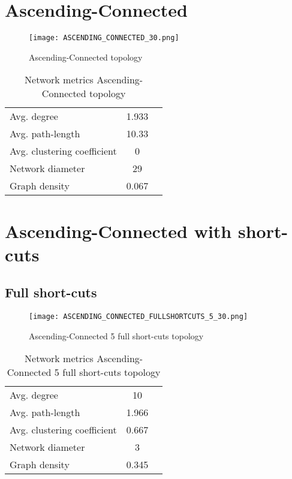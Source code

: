 \documentclass[Bachelorarbeit.tex]{subfiles}
\begin{document}
\section{Ascending-Connected}
\begin{figure}[H]
	\centering
  \texttt{[image: ASCENDING\_CONNECTED\_30.png]}
	\caption{Ascending-Connected topology}
	\label{fig1}
\end{figure}

\begin{table}[h]
	\centering
	\caption{Network metrics Ascending-Connected topology}
	\begin{tabular} { l c r }
		\hline
		Avg. degree & 1.933 \\
		Avg. path-length & 10.33 \\
		Avg. clustering coefficient & 0 \\
		Network diameter & 29 \\
		Graph density & 0.067 \\
		\hline
	\end{tabular}
\end{table}

\section{Ascending-Connected with short-cuts}
\subsection{Full short-cuts}
\begin{figure}[H]
	\centering
  \texttt{[image: ASCENDING\_CONNECTED\_FULLSHORTCUTS\_5\_30.png]}
	\caption{Ascending-Connected 5 full short-cuts topology}
	\label{fig1}
\end{figure}

\begin{table}[h]
	\centering
	\caption{Network metrics Ascending-Connected 5 full short-cuts topology}
	\begin{tabular} { l c r }
		\hline
		Avg. degree & 10 \\
		Avg. path-length & 1.966 \\
		Avg. clustering coefficient & 0.667 \\
		Network diameter & 3 \\
		Graph density & 0.345 \\
		\hline
	\end{tabular}
\end{table}
\end{document}
